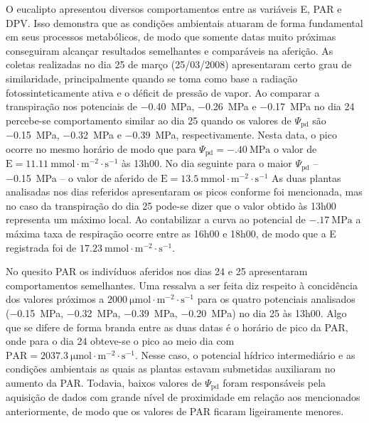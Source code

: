 \documentclass[a4paper, 12pt]{article}
\numberwithin{equation}{section}
\begin{document}
	O eucalipto apresentou diversos comportamentos entre as variáveis E, PAR e DPV. Isso demonstra que as condições ambientais atuaram de forma fundamental em seus processos metabólicos, de modo que somente datas muito próximas conseguiram alcançar resultados semelhantes e comparáveis na aferição. As coletas realizadas no dia 25 de março (25/03/2008) apresentaram certo grau de similaridade, principalmente quando se toma como base a radiação fotossinteticamente ativa e o déficit de pressão de vapor. Ao comparar a transpiração nos potenciais de \SI{-.40}{\mega\pascal}, \SI{-.26}{\mega\pascal} e \SI{-.17}{\mega\pascal} no dia 24 percebe-se comportamento similar ao dia 25 quando os valores de $\Psi_{\textrm{pd}}$ são \SI{-.15}{\mega\pascal}, \SI{-.32}{\mega\pascal} e \SI{-.39}{\mega\pascal}, respectivamente. Nesta data, o pico ocorre no mesmo horário de modo que para $\Psi_{\textrm{pd}}=\SI{-.40}{\mega\pascal}$ o valor de $\textrm{E}=\SI{11.11}{\milli\mole\cdot\meter^{-2}\cdot\second^{-1}}$ às 13h00. No dia seguinte para o maior $\Psi_{\textrm{pd}}$ -- \SI{-.15}{\mega\pascal} -- o valor de aferido de $\textrm{E}=\SI{13.5}{\milli\mole\cdot\meter^{-2}\cdot\second^{-1}}$ As duas plantas analisadas nos dias referidos apresentaram os picos conforme foi mencionada, mas no caso da transpiração do dia 25 pode-se dizer que o valor obtido às 13h00 representa um máximo local. Ao contabilizar a curva ao potencial de $\SI{-.17}{\mega\pascal}$ a máxima taxa de respiração ocorre entre as 16h00 e 18h00, de modo que a E registrada foi de $\SI{17.23}{\milli\mole\cdot\meter^{-2}\cdot\second^{-1}}$.
	
	No quesito PAR os indivíduos aferidos nos dias 24 e 25 apresentaram comportamentos semelhantes. Uma ressalva a ser feita diz respeito à concidência dos valores próximos a $\SI{2000}{\micro\mole\cdot\meter^{-2}\cdot\second^{-1}}$ para os quatro potenciais analisados (\SI{-.15}{\mega\pascal}, \SI{-.32}{\mega\pascal}, \SI{-.39}{\mega\pascal}, \SI{-.20}{\mega\pascal}) no dia 25 às 13h00. Algo que se difere de forma branda entre as duas datas é o horário  de pico da PAR, onde para o dia 24 obteve-se o pico ao meio dia com $\textrm{PAR}=\SI{2037.3}{\micro\mole\cdot\meter^{-2}\cdot\second^{-1}}$. Nesse caso, o potencial hídrico intermediário e as condições ambientais as quais as plantas estavam submetidas auxiliaram no aumento da PAR. Todavia, baixos valores de $\Psi_{\textrm{pd}}$ foram responsáveis pela aquisição de dados com grande nível de proximidade em relação aos mencionados anteriormente, de modo que os valores de PAR ficaram ligeiramente menores.
	
\end{document}
